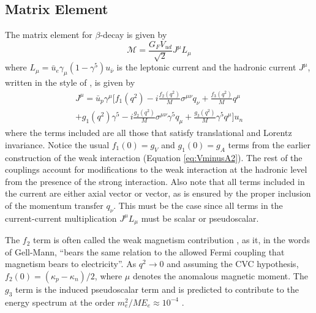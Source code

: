 \subsection{Matrix Element}
The matrix element for $\beta$-decay is given by
%
\begin{equation}
  \mathcal{M} = \frac{G_FV_{ud}}{\sqrt{2}} J^\mu L_\mu
  \label{eq:M}
\end{equation}
%
where $L_\mu = \bar{u}_e \gamma_\mu (1-\gamma^5) u_{\bar{\nu}}$ is the leptonic current
and the hadronic current $J^\mu$, written in the style of \cite{gardner2001}, is given by
%
\begin{multline}
  J^\mu = \bar{u}_p \gamma^\mu \bigg[ f_1(q^2) - i \frac{f_{2}(q^2)}{M}\sigma^{\mu\nu}q_\nu + \frac{f_3(q^2)}{M}q^\mu \\
    + g_1(q^2)\gamma^5 - i \frac{g_{2}(q^2)}{M}\sigma^{\mu\nu}\gamma^5q_\mu 
    +  \frac{g_3(q^2)}{M}\gamma^5q^\mu \bigg] u_n
  \label{eq:hadronicCurrent}
\end{multline}
%
where the terms included are all those that satisfy translational and Lorentz invariance. Notice the
usual $f_1(0)=g_V$ and $g_1(0) = g_A$ terms from the earlier construction of the weak interaction
(Equation \ref{eq:VminusA2}). The
rest of the couplings
account for modifications to the weak interaction at the hadronic level from the presence of the strong
interaction. Also note that all terms
included in the current are either axial vector or vector, as is ensured by the proper inclusion of the momentum
transfer $q_\nu$. This must be the case since all terms in the current-current multiplication $J^\mu L_\mu$ must be
scalar or pseudoscalar.

The $f_2$ term is often called the weak magnetism contribution \cite{gellmann1958}, as it, in
the words of Gell-Mann,
``bears the same relation to the allowed Fermi coupling that magnetism bears to electricity''.
As $q^2\rightarrow0$ and assuming the CVC hypothesis,
$f_2(0) = (\kappa_p - \kappa_n)/2$, where $\mu$ denotes the anomalous magnetic moment.
The $g_3$ term is the induced pseudoscalar term and is predicted to contribute
to the energy spectrum at the order $m_e^2/ME_e \approx 10^{-4}$
\cite{holstein1974recoil,plaster2012}.

